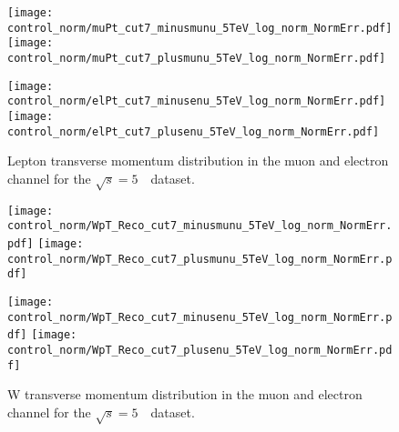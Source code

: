 \begin{figure}[h]
	\centering
	{\texttt{[image: control\_norm/muPt\_cut7\_minusmunu\_5TeV\_log\_norm\_NormErr.pdf]}\label{f:}}
	{\texttt{[image: control\_norm/muPt\_cut7\_plusmunu\_5TeV\_log\_norm\_NormErr.pdf]}\label{f:}}
	
	{\texttt{[image: control\_norm/elPt\_cut7\_minusenu\_5TeV\_log\_norm\_NormErr.pdf]}\label{f:}}
	{\texttt{[image: control\_norm/elPt\_cut7\_plusenu\_5TeV\_log\_norm\_NormErr.pdf]}\label{f:}}
	\caption{  Lepton transverse momentum distribution in the muon and electron channel  for the $\sqrt{s} = 5$~\TeV\ dataset. }\end{figure}
	\newpage
\begin{figure}[h]
	\centering
	{\texttt{[image: control\_norm/WpT\_Reco\_cut7\_minusmunu\_5TeV\_log\_norm\_NormErr.pdf]}\label{f:}}
	{\texttt{[image: control\_norm/WpT\_Reco\_cut7\_plusmunu\_5TeV\_log\_norm\_NormErr.pdf]}\label{f:}}

	{\texttt{[image: control\_norm/WpT\_Reco\_cut7\_minusenu\_5TeV\_log\_norm\_NormErr.pdf]}\label{f:}}
	{\texttt{[image: control\_norm/WpT\_Reco\_cut7\_plusenu\_5TeV\_log\_norm\_NormErr.pdf]}\label{f:}}
	\caption{  W transverse momentum distribution in the muon and electron channel  for the $\sqrt{s} = 5$~\TeV\ dataset. }\end{figure}
	\newpage
	\clearpage
%
%

